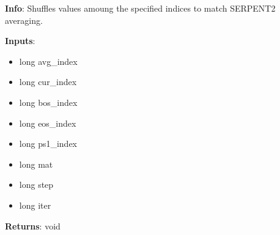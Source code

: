 \textbf{Info}: Shuffles values amoung the specified indices to match SERPENT2
averaging.

\noindent \textbf{Inputs}:
\begin{itemize}
\item{long avg\_index}
\item{long cur\_index}
\item{long bos\_index}
\item{long eos\_index}
\item{long ps1\_index}
\item{long mat}
\item{long step}
\item{long iter}
\end{itemize}

\noindent \textbf{Returns}: void
